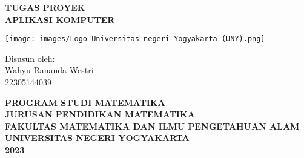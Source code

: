 \documentclass[12pt,arial,letterpaper]{book}
\begin{document}
\clearpage
\thispagestyle{empty}
\frontmatter
\begin{center}
    \huge{\textbf{TUGAS PROYEK \\ APLIKASI KOMPUTER}}
\end{center}
\vspace{3cm}
\begin{minipage}{17cm}
    \begin{center}
          \texttt{[image: images/Logo Universitas negeri Yogyakarta (UNY).png]}
    \end{center}
\end{minipage}

\vspace{3cm}

\begin{center}
    \large{Disusun oleh: \\ Wahyu Rananda Westri \\ 22305144039}
\end{center}

\vspace{2cm}
\begin{center}
    \large{\textbf{PROGRAM STUDI MATEMATIKA}} \\
    \large{\textbf{JURUSAN PENDIDIKAN MATEMATIKA}} \\
    \large{\textbf{FAKULTAS MATEMATIKA DAN ILMU PENGETAHUAN ALAM}} \\
    \large{\textbf{UNIVERSITAS NEGERI YOGYAKARTA}} \\
    \large{\textbf{2023}}
\end{center}

\clearpage
\thispagestyle{empty}
\tableofcontents
\mainmatter
\end{document}
